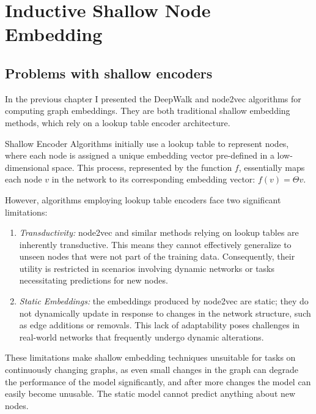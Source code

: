 \chapter{Inductive Shallow Node Embedding}
\label{sec:ISNE}

\section{Problems with shallow encoders}
In the previous chapter I presented the DeepWalk and node2vec algorithms for computing graph embeddings. They are both traditional shallow embedding methods, which rely on a lookup table encoder architecture.

Shallow Encoder Algorithms initially use a lookup table to represent nodes, where each node is assigned a unique embedding vector pre-defined in a low-dimensional space. This process, represented by the function $f$, essentially maps each node $v$ in the network to its corresponding embedding vector: ${f(v) = \Theta v}$.

However, algorithms employing lookup table encoders face two significant limitations:

\begin{enumerate}

    \item \emph{Transductivity:} node2vec and similar methods relying on lookup tables are inherently transductive. This means they cannot effectively generalize to unseen nodes that were not part of the training data. Consequently, their utility is restricted in scenarios involving dynamic networks or tasks necessitating predictions for new nodes.

    \item \emph{Static Embeddings:} the embeddings produced by node2vec are static; they do not dynamically update in response to changes in the network structure, such as edge additions or removals. This lack of adaptability poses challenges in real-world networks that frequently undergo dynamic alterations.

\end{enumerate}

These limitations make shallow embedding techniques unsuitable for tasks on continuously changing graphs, as even small changes in the graph can degrade the performance of the model significantly, and after more changes the model can easily become unusable. The static model cannot predict anything about new nodes. 

